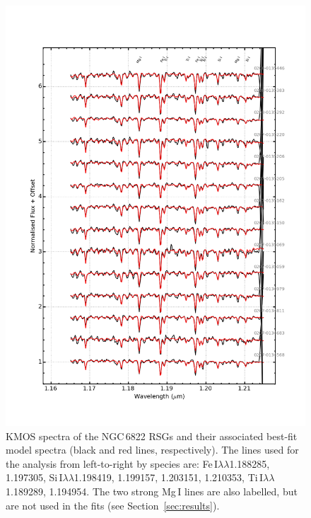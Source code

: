 \documentclass[useAMS,usenatbib]{mn2e}
\begin{document}
\begin{figure}
 \begin{center}
\includegraphics[width=16cm]{NGC2100-model-fits}
\caption{KMOS spectra of the NGC\,6822 RSGs and their associated best-fit model spectra
(black and red lines, respectively).
The lines used for the analysis from left-to-right by species are:
Fe\,I$\lambda\lambda$1.188285,
1.197305,
Si\,I$\lambda\lambda$1.198419,
1.199157,
1.203151,
1.210353,
Ti\,I$\lambda\lambda$1.189289,
1.194954.
The two strong Mg\,I lines are also labelled, but are not used in the fits
(see Section~\ref{sec:results}).
         }
\label{fig:model_fits}
\end{center}
\end{figure}
\end{document}
